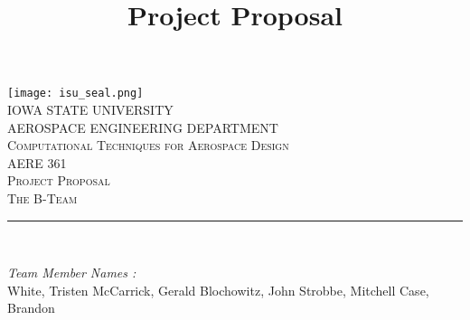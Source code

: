 \documentclass[12pt]{article}
\begin{document}
\title{Project Proposal}

\begin{titlepage}
	\centering
    \vspace*{0.5 cm}
    \texttt{[image: isu\_seal.png]}\\[1.0 cm]	%
    \textsc{\LARGE IOWA STATE UNIVERSITY}\\[2.0 cm]
    \textsc{\large AEROSPACE ENGINEERING DEPARTMENT}\\[0.2 cm]
    \textsc{\large Computational Techniques for Aerospace Design}\\[0.2 cm]
	\textsc{\Large AERE 361}\\[0.5 cm]				%
	\textsc{\Large Project Proposal}\\[0.2 cm]
	\textsc{\Large The B-Team}\\[0.2 cm]
	\rule{\linewidth}{0.2 mm} \\[0.4 cm]
	
	
	\begin{minipage}{0.8\textwidth}
		
			\begin{flushleft} 
			\emph{Team Member Names :} \\
			White, Tristen\linebreak
			McCarrick, Gerald\linebreak
			Blochowitz, John\linebreak
			Strobbe, Mitchell\linebreak
			Case, Brandon\linebreak
			
		\end{flushleft}
	\end{minipage}\\[2 cm]
	
	\vfill
	
\end{titlepage}

\tableofcontents
\pagebreak

\newpage
\end{document}
